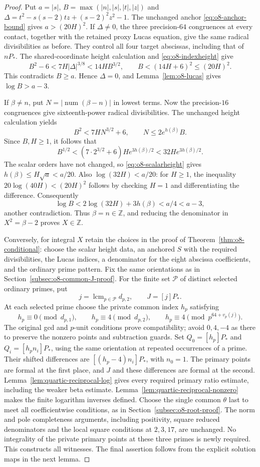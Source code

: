 \documentclass[11pt]{article}
\theoremstyle{definition}
\theoremstyle{remark}
\newcommand{\Z}{\mathbb Z}
\begin{document}
\begin{proof}
Put $a=|s|$, $B=\max(|n|,|s|,|t|,|z|)$ and
$\Delta=t^2-s(s-2)tz+(s-2)^2z^2-1$.
The unchanged anchor \eqref{eq:o8-anchor-bound} gives
$a>(20H)^2$. If $\Delta\ne0$, the three precision-$64$ congruences
at every contact, together with the retained proxy Lucas equation,
give the same radical divisibilities as before. They control all four
target abscissas, including that of $nP_*$. The shared-coordinate
height calculation and \eqref{eq:o8-indexheight} give
\[
 B^2-6<7H|\Delta|^{3/8}<14HB^{3/2},
 \qquad B<(14H+6)^2\le(20H)^2.
\]
This contradicts $B\ge a$. Hence $\Delta=0$, and
Lemma~\ref{lem:o8-lucas} gives $\log B>a-3$.

If $\beta\ne n$, put $N=|\operatorname{num}(\beta-n)|$ in lowest terms.
Now the precision-$16$ congruences give sixteenth-power radical
divisibilities. The unchanged height calculation yields
\[
 B^2<7HN^{3/2}+6,\qquad N\le2e^{h(\beta)}B.
\]
Since $B,H\ge1$, it follows that
\[
 B^{1/2}<(7\cdot2^{3/2}+6)He^{3h(\beta)/2}
          <32He^{3h(\beta)/2}.
\]
The scalar orders have not changed, so \eqref{eq:o8-scalarheight} gives
$h(\beta)\le H\sqrt a<a/20$. Also $\log(32H)<a/20$:
for $H\ge1$, the inequality $20\log(40H)<(20H)^2$ follows by
checking $H=1$ and differentiating the difference. Consequently
\[
 \log B<2\log(32H)+3h(\beta)<a/4<a-3,
\]
another contradiction. Thus $\beta=n\in\Z$, and reducing the
denominator in $X^2=\beta-2$ proves $X\in\Z$.

Conversely, for integral $X$ retain the choices in the proof of
Theorem~\ref{thm:o8-conditional}: choose the scalar height data, an anchored
$S$ with the required divisibilities, the Lucas indices, a denominator
for the eight abscissa coefficients, and the ordinary prime pattern.
Fix the same orientations as in Section~\ref{subsec:o8-common-J-proof}.
For the finite set $\mathcal P$ of distinct selected ordinary primes, put
\[
 j=\operatorname{lcm}_{p\in\mathcal P}d_{p,2},\qquad J=[j]P_*.
\]
At each selected prime choose the private common index $h_p$ satisfying
\[
 h_p\equiv0\pmod {d_{p,1}},\qquad h_p\equiv4\pmod {d_{p,2}},
 \qquad h_p\equiv4\pmod {p^{64+v_p(j)}}.
\]
The original gcd and $p$-unit conditions prove compatibility; avoid
$0,4,-4$ as there to preserve the nonzero points and subtraction guards.
Set $Q_0=[h_p]P_*$ and $Q_i=[h_pn_i]P_*$, using the same orientation at
repeated occurrences of a prime. Their shifted differences are
$[(h_p-4)n_i]P_*$, with $n_0=1$. The primary points are formal at the
first place, and $J$ and these differences are formal at the second.
Lemma~\ref{lem:quartic-reciprocal-log} gives every required primary ratio
estimate, including the weaker beta estimate. Lemma~\ref{lem:quartic-reciprocal-nonzero}
makes the finite logarithm inverses defined. Choose the single common
$\theta$ last to meet all coefficientwise conditions, as in
Section~\ref{subsec:o8-root-proof}. The norm and pole completeness
arguments, including positivity, square reduced denominators and the
local square conditions at $2,3,17$, are unchanged. No integrality of
the private primary points at these three primes is newly required.
This constructs all witnesses. The final assertion follows from the
explicit solution maps in the next lemma.
\end{proof}
\end{document}
